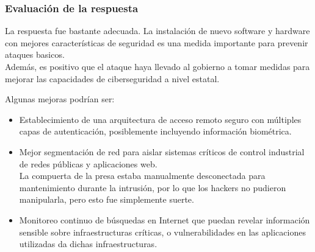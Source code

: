 \subsubsection{Evaluación de la respuesta}
La respuesta fue bastante adecuada.
La instalación de nuevo software y hardware con mejores características de seguridad es una medida importante para prevenir ataques basicos.\\
Además, es positivo que el ataque haya llevado al gobierno a tomar medidas para mejorar las capacidades de ciberseguridad a nivel estatal.



Algunas mejoras podrían ser:
\begin{itemize}
    \item Establecimiento de una arquitectura de acceso remoto seguro con múltiples capas de autenticación, posiblemente incluyendo información biométrica.
    \item Mejor segmentación de red para aislar sistemas críticos de control industrial de redes públicas y aplicaciones web.\\
    La compuerta de la presa estaba manualmente desconectada para mantenimiento durante la intrusión, por lo que los hackers no pudieron manipularla, pero esto fue simplemente suerte.
    \item Monitoreo continuo de búsquedas en Internet que puedan revelar información sensible sobre infraestructuras críticas, o vulnerabilidades en las aplicaciones utilizadas da dichas infraestructuras.
\end{itemize}

